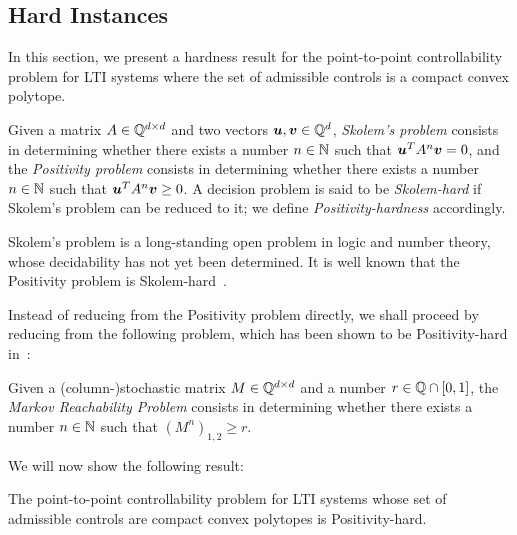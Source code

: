 \subsection{Hard Instances}

In this section, we present a hardness result for the point-to-point controllability problem for LTI systems where the set of admissible controls is a compact convex polytope.

\begin{definition}
Given a matrix $A \in \mathbb{Q}^{d \times d}$ and two vectors
$\boldsymbol{u}, \boldsymbol{v} \in \mathbb{Q}^{d}$, \emph{Skolem's problem} consists in determining
whether there exists a number $n \in \mathbb{N}$ such that
$\boldsymbol{u}^{T} A^{n} \boldsymbol{v} = 0$, and the \emph{Positivity problem} consists in determining whether there exists a number $n \in \mathbb{N}$ such that $\boldsymbol{u}^{T} A^{n} \boldsymbol{v} \geq 0$. A decision problem is said to be \emph{Skolem-hard} if Skolem's problem can be reduced to it; we define \emph{Positivity-hardness} accordingly.
\end{definition}

Skolem's problem is a long-standing open problem in logic and number theory, whose decidability has not yet been determined. It is well known that the Positivity problem is Skolem-hard~\cite{OW14:SODA}.

Instead of reducing from the Positivity problem directly, we shall proceed by reducing from the following problem, which has been shown to be Positivity-hard in~\cite{MRP}:
\begin{definition}
Given a (column-)stochastic matrix $M \in \mathbb{Q}^{d \times d}$ and a number $r \in \mathbb{Q} \cap [0,1]$,
the \emph{Markov Reachability Problem} consists in determining whether there exists a number $n \in \mathbb{N}$ such that $\left( M^{n} \right)_{1,2} \geq r$.
\end{definition}

We will now show the following result:

\begin{theorem}
The point-to-point controllability problem for LTI systems whose set of admissible controls are compact convex polytopes is Positivity-hard.
\end{theorem}

